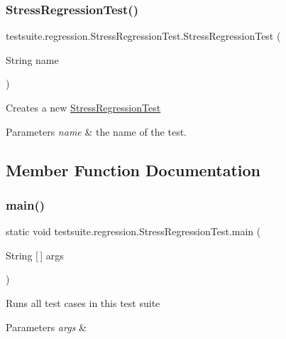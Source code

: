 \subsubsection{\texorpdfstring{Stress\+Regression\+Test()}{StressRegressionTest()}}
{\footnotesize\ttfamily testsuite.\+regression.\+Stress\+Regression\+Test.\+Stress\+Regression\+Test (\begin{DoxyParamCaption}\item[{String}]{name }\end{DoxyParamCaption})}

Creates a new \mbox{\hyperlink{classtestsuite_1_1regression_1_1_stress_regression_test}{Stress\+Regression\+Test}}


\begin{DoxyParams}{Parameters}
{\em name} & the name of the test. \\
\hline
\end{DoxyParams}


\subsection{Member Function Documentation}
\mbox{\label{classtestsuite_1_1regression_1_1_stress_regression_test_a4ebefbb66146f2d6d7401978c038b691}} 
\subsubsection{\texorpdfstring{main()}{main()}}
{\footnotesize\ttfamily static void testsuite.\+regression.\+Stress\+Regression\+Test.\+main (\begin{DoxyParamCaption}\item[{String \mbox{[}$\,$\mbox{]}}]{args }\end{DoxyParamCaption})\hspace{0.3cm}{\ttfamily [static]}}

Runs all test cases in this test suite


\begin{DoxyParams}{Parameters}
{\em args} & \\
\hline
\end{DoxyParams}
\mbox{\label{classtestsuite_1_1regression_1_1_stress_regression_test_a21dd782b4c69fab5bcaee492e3400303}} 
